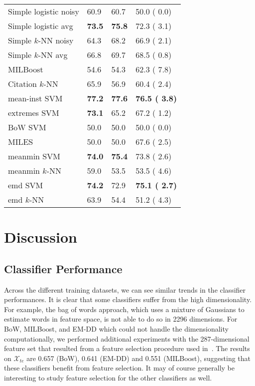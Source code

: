 \documentclass[10pt,conference,a4paper]{IEEEtran}
\begin{document}
\begin{table}[ht]
\begin{center}
\begin{tabular}{l l l l}
Simple logistic noisy & 60.9 & 60.7 & 50.0 ( 0.0) \\
Simple logistic avg   & {\bf 73.5 }& {\bf 75.8 }& 72.3 ( 3.1)\\
Simple $k$-NN noisy     & 64.3 &  68.2 &  66.9 ( 2.1) \\
Simple $k$-NN avg       & 66.8 & 69.7 & 68.5 ( 0.8) \\
MILBoost & 54.6 & 54.3 & 62.3 ( 7.8) \\
Citation $k$-NN & 65.9 & 56.9 & 60.4 ( 2.4) \\
mean-inst SVM         & {\bf 77.2 }& {\bf 77.6 }& {\bf 76.5 ( 3.8)}\\
extremes SVM          & {\bf 73.1 }& 65.2 & 67.2 ( 1.2)\\
BoW SVM               & 50.0 & 50.0 & 50.0 ( 0.0) \\
MILES 								& 50.0 & 50.0 & 67.6 ( 2.5) \\
meanmin SVM           & {\bf 74.0 }& {\bf 75.4 }& 73.8 ( 2.6)\\
meanmin $k$-NN          & 59.0 & 53.5 & 53.5 ( 4.6) \\
emd SVM               & {\bf 74.2 }& 72.9 & {\bf 75.1 ( 2.7)}\\
emd $k$-NN              & 63.9 & 54.4 & 51.2 ( 4.3) \\




\end{tabular}
\end{center}\label{tab:res_simple}
\end{table}





\section{Discussion}\label{sec:results}

\subsection{Classifier Performance}

Across the different training datasets, we can see similar trends in the classifier performances. It is clear that some classifiers suffer from the high dimensionality. For example, the bag of words approach, which uses a mixture of Gaussians to estimate words in feature space, is not able to do so in 2296 dimensions. For BoW, MILBoost, and EM-DD which could not handle the dimensionality computationally, we performed additional experiments with the 287-dimensional feature set that resulted from a feature selection procedure used in~\cite{sorensen2012texture}. The results on $\mathcal{X}_{te}$ are 0.657 (BoW), 0.641 (EM-DD) and 0.551 (MILBoost), suggesting that these classifiers benefit from feature selection. It may of course generally be interesting to study feature selection for the other classifiers as well.
\end{document}
